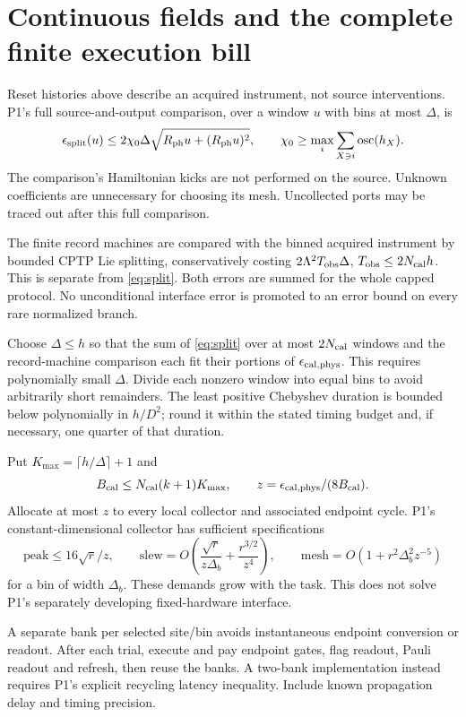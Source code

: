 \documentclass[11pt]{article}
\begin{document}
\section{Continuous fields and the complete finite execution bill}
Reset histories above describe an acquired instrument, not source interventions.
P1's full source-and-output comparison, over a window \(u\) with bins at
most \(\Delta\), is
\begin{equation}
\epsilon_{\rm split}(u)\le
2\chi_0\Delta\sqrt{R_{\rm ph}u+(R_{\rm ph}u)^2},
\qquad
\chi_0\ge\max_i\sum_{X\ni i}\operatorname{osc}(h_X).
\label{eq:split}
\end{equation}
The comparison's Hamiltonian kicks are not performed on the source.
Unknown coefficients are unnecessary for choosing its mesh. Uncollected
ports may be traced out after this full comparison.

The finite record machines are compared with the binned acquired instrument
by bounded CPTP Lie splitting, conservatively costing
\(2\Lambda^2T_{\rm obs}\Delta\), \(T_{\rm obs}\le2N_{\rm cal}h\).
This is separate from \eqref{eq:split}. Both errors are summed for the
whole capped protocol. No unconditional interface error is promoted to
an error bound on every rare normalized branch.

Choose \(\Delta\le h\) so that the sum of \eqref{eq:split} over at most
\(2N_{\rm cal}\) windows and the record-machine comparison each fit
their portions of \(\epsilon_{\rm cal,phys}\). This requires polynomially
small \(\Delta\). Divide each nonzero window into equal bins to avoid
arbitrarily short remainders. The least positive Chebyshev duration is
bounded below polynomially in \(h/D^2\); round it within the stated timing
budget and, if necessary, one quarter of that duration.

Put \(K_{\max}=\lceil h/\Delta\rceil+1\) and
\[
B_{\rm cal}\le N_{\rm cal}(k+1)K_{\max},\qquad
z=\epsilon_{\rm cal,phys}/(8B_{\rm cal}).
\]
Allocate at most \(z\) to every local collector and associated endpoint
cycle. P1's constant-dimensional collector has sufficient specifications
\[
\mathrm{peak}\le16\sqrt r/z,\qquad
\mathrm{slew}=O\!\left(\frac{\sqrt r}{z\Delta_b}
+\frac{r^{3/2}}{z^4}\right),\qquad
\mathrm{mesh}=O(1+r^2\Delta_b^2z^{-5})
\]
for a bin of width \(\Delta_b\). These demands grow with the task.
This does not solve P1's separately developing fixed-hardware interface.

A separate bank per selected site/bin avoids instantaneous endpoint
conversion or readout. After each trial, execute and pay endpoint gates,
flag readout, Pauli readout and refresh, then reuse the banks.
A two-bank implementation instead requires P1's explicit recycling
latency inequality. Include known propagation delay and timing precision.
\end{document}
